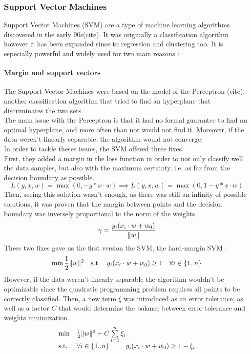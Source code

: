 \documentclass{article}
\DeclarePairedDelimiter{\norm}{\lVert}{\rVert}
\theoremstyle{definition}
\begin{document}
\subsubsection{Support Vector Machines}
Support Vector Machines (SVM) are a type of machine learning algorithms discovered in the early 90s(cite). It was originally a classification algorithm however it has been expanded since to regression and clustering too. It is especially powerful and widely used for two main reasons :
\paragraph{Margin and support vectors}
The Support Vector Machines were based on the model of the Perceptron (cite), another classification algorithm that tried to find an hyperplane that discriminates the two sets.\\
The main issue with the Perceptron is that it had no formal guarantee to find an optimal hyperplane, and more often than not would not find it. Moreover, if the data weren't linearly separable, the algorithm would not converge.\\
In order to tackle theses issues, the SVM offered three fixes. \\
First, they added a margin in the loss function in order to not only classify well the data samples, but also with the maximum certainty, i.e. as far from the decision boundary as possible.\\
\begin{equation}
    L(y,x,w) = \max(0,-y*x \cdot w) \implies L(y,x,w) = \max(0,1-y*x\cdot w)
\end{equation}
Then, seeing this solution wasn't enough, as there was still an infinity of possible solutions, it was proven that the margin between points and the decision boundary was inversely proportional to the norm of the weights.\\
\begin{equation}
\gamma = \frac{y_{i}(x_{i} \cdot w + w_{0})}{\norm{w}}
\end{equation}
These two fixes gave us the first version the SVM, the hard-margin SVM :\\ 
\begin{equation}
    \min \frac{1}{2}\norm{w}^{2} \quad
\textup{s.t.}\quad y_{i}(x_{i} \cdot w + w_{0}) \geq 1 \quad \forall i \in \{1..n\}
\end{equation}
However, if the data weren't linearly separable the algorithm wouldn't be optimizable since the quadratic programming problem requires all points to be correctly classified. Then, a new term $\xi$ was introduced as an error tolerance, as well as a factor $C$ that would determine the balance between error tolerance and weights minimization.\\
\begin{equation}
\begin{array}{ll@{}ll}
\text{min}  & \frac{1}{2}\norm{w}^{2}+C\sum\limits_{i=1}^{n}\xi_{i} &\\
\text{s.t.}& \forall i \in \{1..n\} & y_{i}(x_{i} \cdot w + w_{0}) \geq 1-\xi_{i}
\end{array}
\end{equation}
\end{document}
